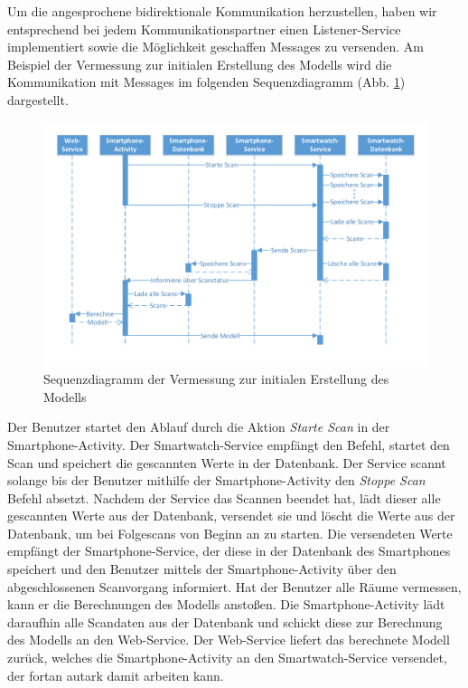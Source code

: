 Um die angesprochene bidirektionale Kommunikation herzustellen, haben wir entsprechend
bei jedem Kommunikationspartner einen Listener-Service implementiert sowie die Möglichkeit geschaffen Messages zu versenden. Am Beispiel der Vermessung zur initialen Erstellung des Modells wird die Kommunikation mit Messages im folgenden Sequenzdiagramm (Abb. \ref{fig:SequenzdiagrammScan}) dargestellt.

\begin{figure}[H]
\centering
\includegraphics[width=1\linewidth]{../Bilder/SequenzdiagrammScan}
\caption{Sequenzdiagramm der Vermessung zur initialen Erstellung des Modells}
\label{fig:SequenzdiagrammScan}
\end{figure}

Der Benutzer startet den Ablauf durch die Aktion \textit{Starte Scan} in der Smartphone-Activity. Der Smartwatch-Service empfängt den Befehl, startet den Scan und speichert die gescannten Werte in der Datenbank. Der Service scannt solange bis der Benutzer mithilfe der Smartphone-Activity den \textit{Stoppe Scan} Befehl absetzt. Nachdem der Service das Scannen beendet hat, lädt dieser alle gescannten Werte aus der Datenbank, versendet sie und löscht die Werte aus der Datenbank, um bei Folgescans von Beginn an zu starten. Die versendeten Werte empfängt der Smartphone-Service, der diese in der Datenbank des Smartphones speichert und den Benutzer mittels der Smartphone-Activity über den abgeschlossenen Scanvorgang informiert. Hat der Benutzer alle Räume vermessen, kann er die Berechnungen des Modells anstoßen. Die Smartphone-Activity lädt daraufhin alle Scandaten aus der Datenbank und schickt diese zur Berechnung des Modells an den Web-Service. Der Web-Service liefert das berechnete Modell zurück, welches die Smartphone-Activity an den Smartwatch-Service versendet, der fortan autark damit arbeiten kann.

